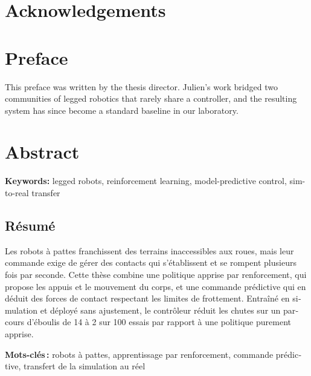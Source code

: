 \documentclass[11pt,oneside,a4paper]{report}
\begin{document}


\chapter*{Acknowledgements}

\clearpage
\chapter*{Preface}
This preface was written by the thesis director. Julien's work bridged two communities of
legged robotics that rarely share a controller, and the resulting system has since become a
standard baseline in our laboratory.
\clearpage
\chapter*{Abstract}


\medskip\noindent\textbf{Keywords:} legged robots, reinforcement learning, model-predictive control, sim-to-real transfer
\clearpage
\begin{otherlanguage}{french}
\chapter*{Résumé}
Les robots à pattes franchissent des terrains inaccessibles aux roues, mais leur commande exige
de gérer des contacts qui s'établissent et se rompent plusieurs fois par seconde. Cette thèse
combine une politique apprise par renforcement, qui propose les appuis et le mouvement du corps,
et une commande prédictive qui en déduit des forces de contact respectant les limites de
frottement. Entraîné en simulation et déployé sans ajustement, le contrôleur réduit les chutes
sur un parcours d'éboulis de 14 à 2 sur 100 essais par rapport à une politique purement apprise.

\medskip\noindent\textbf{Mots-clés\,:} robots à pattes, apprentissage par renforcement, commande prédictive, transfert de la simulation au réel
\end{otherlanguage}
\clearpage
\tableofcontents
\listoffigures
\listoftables
\clearpage
{}





\end{document}
